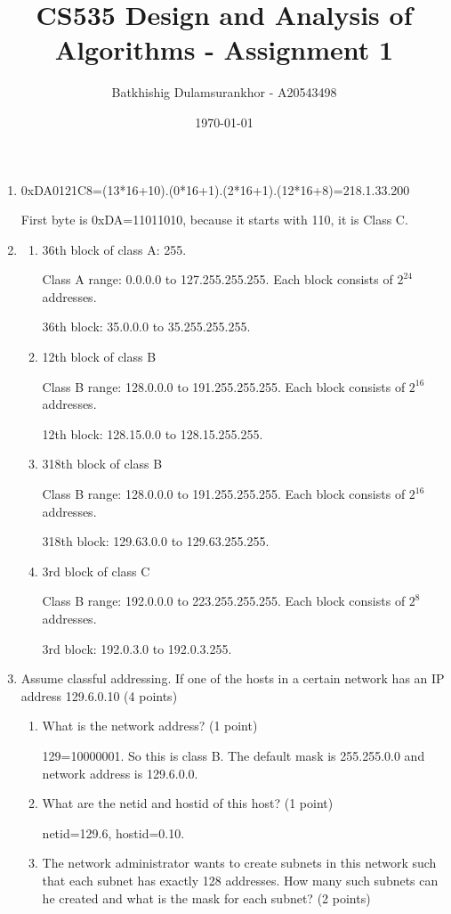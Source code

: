 \documentclass{article}
\title{CS535 Design and Analysis of Algorithms - Assignment 1}
\author{Batkhishig Dulamsurankhor - A20543498}
\date{\today} %
\begin{document}
\maketitle

\begin{enumerate}
  \item 0xDA0121C8=(13*16+10).(0*16+1).(2*16+1).(12*16+8)=218.1.33.200

  First byte is 0xDA=11011010, because it starts with 110, it is Class C.
  \item
    \begin{enumerate}
      \item 36th block of class A: 255.

      Class A range: 0.0.0.0 to 127.255.255.255. Each block consists of $2^{24}$ addresses.

      36th block: 35.0.0.0 to 35.255.255.255.

      \item 12th block of class B

      Class B range: 128.0.0.0 to 191.255.255.255. Each block consists of $2^{16}$ addresses.

      12th block: 128.15.0.0 to 128.15.255.255.
      \item 318th block of class B

      Class B range: 128.0.0.0 to 191.255.255.255. Each block consists of $2^{16}$ addresses.

      318th block: 129.63.0.0 to 129.63.255.255.
      \item 3rd block of class C

      Class B range: 192.0.0.0 to 223.255.255.255. Each block consists of $2^{8}$ addresses.

      3rd block: 192.0.3.0 to 192.0.3.255.
    \end{enumerate}
  \item Assume classful addressing. If one of the hosts in a certain network has an IP address 129.6.0.10 (4 points)
  \begin{enumerate}
    \item What is the network address? (1 point)
    
    129=10000001. So this is class B. The default mask is 255.255.0.0 and network address is 129.6.0.0.
    \item What are the netid and hostid of this host? (1 point)
    
    netid=129.6, hostid=0.10.
    \item The network administrator wants to create subnets in this network such that each subnet has exactly 128 addresses. How many such subnets can he created and what is the mask for each subnet? (2 points)


\end{enumerate}
\end{enumerate}
\end{document}
